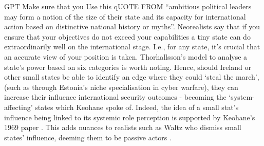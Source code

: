 GPT Make sure that you Use this qUOTE FROM \parencite{THORHALLSSON_2006} ``ambitious political leaders may form a notion of the size of their state and its capacity for international action based on distinctive national
history or myths''. Neorealists say that if you ensure that your objectives do not exceed your capabilities a tiny state can do extraordinarily well on the international stage. I.e., for any state, it's crucial that an accurate view of your position is taken. Thorhallsson's model to analyse a state's power based on six categories is worth noting. Hence, should Ireland or other small states be able to identify an edge where they could `steal the march', (such as through Estonia's niche specialisation in cyber warfare), they can increase their influence international security outcomes - becoming the `system-affecting' states which Keohane spoke of. Indeed, the idea of a small stat's influence being linked to its systemic role perception is supported by Keohane's 1969 paper \parencite{KEOHANE_1969}. This adds nuances to realists such as Waltz who dismiss small states' influence, deeming them to be passive actors \parencite{WALTZ_1979}. 

